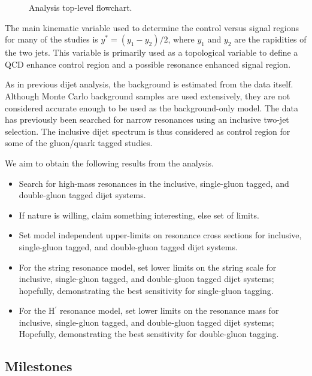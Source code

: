 \begin{figure}[htb]
\caption{Analysis top-level flowchart.}
\label{eflow}
\end{figure}

The main kinematic variable used to determine the control versus
signal regions for many of the studies is $y^* = (y_1-y_2)/2$, where
$y_1$ and $y_2$ are the rapidities of the two jets.
This variable is primarily used as a topological variable to define a QCD
enhance control region and a possible resonance enhanced signal region.

As in previous dijet analysis, the background is estimated from the
data itself.
Although Monte Carlo background samples are used extensively, they are
not considered accurate enough to be used as the background-only model.
The data has previously been searched for narrow resonances using an
inclusive two-jet selection.
The inclusive dijet spectrum is thus considered as control region for
some of the gluon/quark tagged studies. 

We aim to obtain the following results from the analysis.

\begin{itemize}
\item Search for high-mass resonances in the inclusive, single-gluon tagged,
  and double-gluon tagged dijet systems.
\item If nature is willing, claim something interesting, else set of
  limits. 
\item Set model independent upper-limits on resonance cross sections for
  inclusive, single-gluon tagged, and double-gluon tagged dijet systems.
\item For the string resonance model, set lower limits on the string
  scale for inclusive, single-gluon tagged, and double-gluon tagged
  dijet systems; hopefully, demonstrating the best sensitivity for
  single-gluon tagging.
\item For the H$^\prime$ resonance model, set lower limits on the
  resonance mass for inclusive, single-gluon tagged, and double-gluon
  tagged dijet systems; Hopefully, demonstrating the best sensitivity
  for  double-gluon tagging.
\end{itemize}

\subsection{Milestones}

